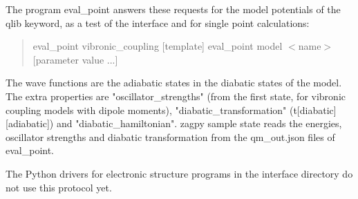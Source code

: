 \documentclass{report}
\begin{document}
The program eval\_point answers these requests for the model potentials of the qlib keyword, as a test of the interface and for single point calculations:
\begin{quote}
	eval\_point vibronic\_coupling [template] \newline
	eval\_point model $<$name$>$ [parameter value ...]
\end{quote}
The wave functions are the adiabatic states in the diabatic states of the model. The extra properties are "oscillator\_strengths" (from the first state, for vibronic coupling models with dipole moments), "diabatic\_transformation" (t[diabatic][adiabatic]) and "diabatic\_hamiltonian". zagpy sample state reads the energies, oscillator strengths and diabatic transformation from the qm\_out.json files of eval\_point.

The Python drivers for electronic structure programs in the interface directory do not use this protocol yet.
\end{document}
